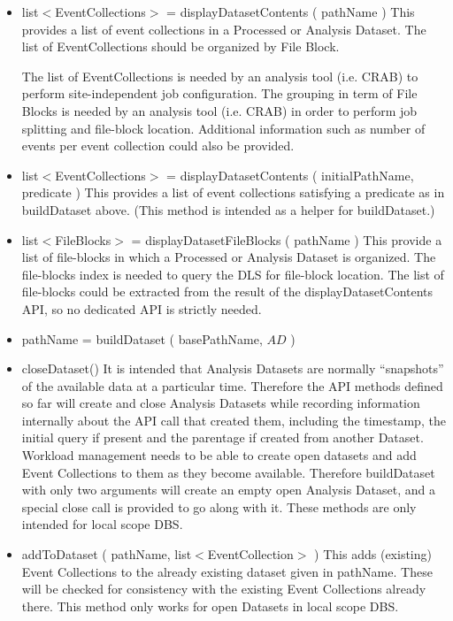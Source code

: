 \documentclass[pdftex]{cmspaper}
\begin{document}
\begin{itemize}
\item  list$<$EventCollections$>$ = displayDatasetContents ( pathName ) 
       This provides a list of event collections in a Processed or Analysis 
       Dataset. The list of EventCollections should be organized by File
       Block.

       The list of EventCollections is needed by an analysis tool (i.e. CRAB)          to perform site-independent job configuration. The grouping in term
       of File Blocks is needed by an analysis tool (i.e. CRAB) in order to 
       perform job splitting and file-block location.
       Additional information such as number of events per event collection
       could also be provided.

\item  list$<$EventCollections$>$ = displayDatasetContents ( initialPathName, predicate ) 
       This provides a list of event collections satisfying a predicate as in 
       buildDataset above.  (This method is intended as a helper for 
       buildDataset.) 

\item list$<$FileBlocks$>$ = displayDatasetFileBlocks ( pathName )
      This provide a list of file-blocks in which a Processed or Analysis
      Dataset is organized.
      The file-blocks index is needed to query the DLS for file-block location. 
      The list of file-blocks could be extracted from the result
      of the displayDatasetContents API, so no dedicated API is 
      strictly needed.

\item  pathName = buildDataset ( basePathName, $AD$ )
\item  closeDataset() 
       It is intended that Analysis Datasets are normally ``snapshots''
       of the available data at a particular time.  Therefore the API
       methods defined so far will create and close Analysis Datasets
       while recording information internally about the API call that
       created them, including the timestamp, the initial query if
       present and the parentage if created from another Dataset.
       Workload management needs to be able to create open datasets
       and add Event Collections to them as they become available.
       Therefore buildDataset with only two arguments will create an
       empty open Analysis Dataset, and a special close call is provided
       to go along with it.  These methods are only intended for local
       scope DBS.

\item  addToDataset ( pathName, list$<$EventCollection$>$ )
       This adds (existing) Event Collections to the already existing dataset 
       given in pathName.  These will be checked for consistency with the 
       existing Event Collections already there.  This method only works for 
       open Datasets in local scope DBS.
   

\end{itemize}
\end{document}
